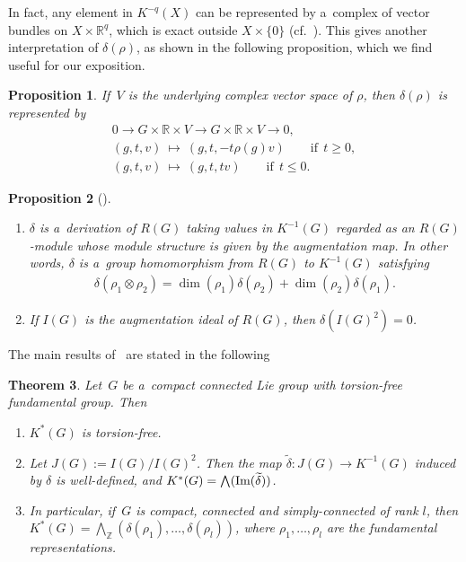 \documentclass[11pt]{article}
\numberwithin{equation}{section}
\newtheorem{Theorem}{Theorem}[section]
\newtheorem{Proposition}[Theorem]{Proposition}
{\theoremstyle{definition}
\newtheorem{Definition}[Theorem]{Definition}
\newtheorem{Example}[Theorem]{Example}
\newtheorem{Remark}[Theorem]{Remark}
}
\begin{document}
{\samepage In fact, any element in $K^{-q}(X)$ can be represented by a~complex of vector bundles on $X\times \mathbb{R}^q$, which
is exact outside $X\times\{0\}$ (cf.~\cite{At}).
This gives another interpretation of $\delta(\rho)$, as shown in the following proposition,
which we f\/ind useful for our
exposition.}

\begin{Proposition}
\label{-1_class}
If~$V$ is the underlying complex vector space of $\rho$, then $\delta(\rho)$ is represented by
\begin{gather*}
0\to G\times\mathbb{R}\times V \to G\times\mathbb{R}\times V\to 0,
\\
(g, t, v) \ \mapsto\  (g, t, -t\rho(g)v) \qquad\text{if} \ \ t\geq 0,
\\
(g, t, v) \ \mapsto\  (g, t, tv) \qquad\text{if}\ \  t\leq 0.
\end{gather*}
\end{Proposition}

\begin{Proposition}[\cite{Ho}]\label{noneqderivation}\quad
\begin{enumerate}\itemsep=0pt
\item[$1.$]
$\delta$ is a~derivation of $R(G)$ taking values in $K^{-1}(G)$ regarded as an $R(G)$-module whose module structure is
given by the augmentation map.
In other words, $\delta$ is a~group homomorphism from $R(G)$ to $K^{-1}(G)$ satisfying
\begin{gather}
\label{leibniz}
\delta(\rho_1\otimes\rho_2)=\dim(\rho_1)\delta(\rho_2)+\dim(\rho_2)\delta(\rho_1).
\end{gather}
\item[$2.$]
If $I(G)$ is the augmentation ideal of $R(G)$, then $\delta(I(G)^2)=0$.
\end{enumerate}
\end{Proposition}

The main results of~\cite{Ho} are stated in the following
\begin{Theorem}
\label{hodgkin}
Let~$G$ be a~compact connected Lie group with torsion-free fundamental group.
Then
\begin{enumerate}\itemsep=0pt
\item[$1.$]
$K^*(G)$ is torsion-free.
\item[$2.$]
Let $J(G):=I(G)/I(G)^2$.
Then the map $\widetilde{\delta}: J(G)\to K^{-1}(G)$ induced by $\delta$ is well-defined, and
$K^*(G)=\bigwedge(\text{\rm Im}(\widetilde{\delta}))$.
\item[$3.$]
In particular, if~$G$ is compact, connected and simply-connected of rank $l$, then
$K^*(G)=\bigwedge_{\mathbb{Z}}(\delta(\rho_1), \dots, \delta(\rho_l))$, where $\rho_1, \dots, \rho_l$ are the
fundamental representations.
\end{enumerate}
\end{Theorem}
\end{document}

